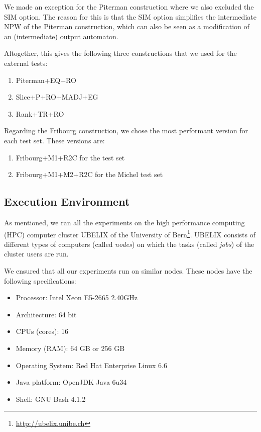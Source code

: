 We made an exception for the Piterman construction where we also excluded the SIM option. The reason for this is that the SIM option simplifies the intermediate NPW of the Piterman construction, which can also be seen as a modification of an (intermediate) output automaton.

Altogether, this gives the following three constructions that we used for the external tests:
\begin{enumerate}
\item Piterman+EQ+RO
\item Slice+P+RO+MADJ+EG
\item Rank+TR+RO
\end{enumerate}

Regarding the Fribourg construction, we chose the most performant version for each test set. These versions are:
\begin{enumerate}
\item Fribourg+M1+R2C for the \goal{} test set
\item Fribourg+M1+M2+R2C for the Michel test set
\end{enumerate}


\subsection{Execution Environment}
\label{4_exec_env}
As mentioned, we ran all the experiments on the high performance computing (HPC) computer cluster UBELIX of the University of Bern\footnote{\url{http://ubelix.unibe.ch}}. UBELIX consists of different types of computers (called \textit{nodes}) on which the tasks (called \textit{jobs}) of the cluster users are run.

We ensured that all our experiments run on similar nodes. These nodes have the following specifications:
\begin{itemize}
\item Processor: Intel Xeon E5-2665 2.40GHz
\item Architecture: 64 bit
\item CPUs (cores): 16
\item Memory (RAM): 64 GB or 256 GB
\item Operating System: Red Hat Enterprise Linux 6.6
\item Java platform: OpenJDK Java 6u34
\item Shell: GNU Bash 4.1.2
\end{itemize}

